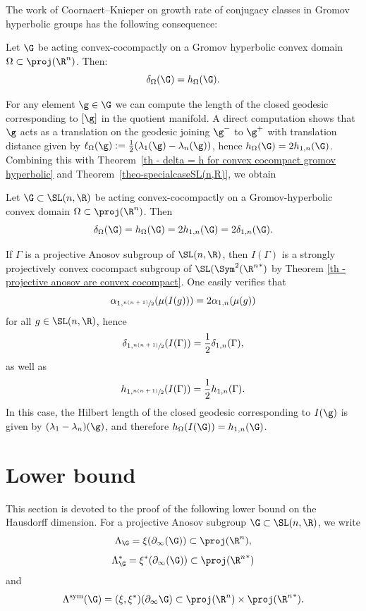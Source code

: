 The work of Coornaert--Knieper on growth rate of conjugacy classes in Gromov hyperbolic groups has the following consequence:
\begin{theorem}\label{th - delta = h for convex cocompact gromov hyperbolic}
Let $\G$ be acting convex-cocompactly on a Gromov hyperbolic convex domain $\Omega\subset \proj(\R^n)$. Then:
\[\delta_\Omega(\G)=h_\Omega(\G).\]
\end{theorem}

For any element $\g\in \G$ we can compute the length of the closed geodesic corresponding to $[\g]$ in the quotient manifold. A direct computation shows that $\g$ acts as a translation on the geodesic joining $\g^-$ to $\g^+$ with translation distance given by $\ell_{\Omega}(\g) := \frac{1}{2}(\lambda_1(\g)-\lambda_n(\g))$, hence $h_\Omega(\G)=2h_{1,n}(\G)$. Combining this with Theorem~\ref{th - delta = h for convex cocompact gromov hyperbolic} and Theorem~\ref{theo-specialcaseSL(n,R)}, we obtain
\begin{coro} \label{cor:deltaH=2delta1n}
Let $\G \subset \SL(n,\R)$ be acting convex-cocompactly on a Gromov-hyperbolic convex domain $\Omega\subset \proj(\R^n)$. Then
\[\delta_\Omega(\G)= h_\Omega(\G) = 2 h_{1,n}(\G) = 2 \delta_{1,n}(\G).\]
\end{coro}

\begin{rmk}
If $\Gamma$ is a projective Anosov subgroup of $\SL(n, \R)$, then $I(\Gamma)$ is a strongly projectively convex cocompact subgroup of $\SL(\Sym^2({\R^n}^*)$ by Theorem \ref{th - projective anosov are convex cocompact}. One easily verifies that
\[\alpha_{1, \sfrac{n(n+1)}{2}}(\mu(I(g))) = 2 \alpha_{1,n}(\mu(g))\]
for all $g\in \SL(n,\R)$, hence
\[\delta_{1, \sfrac{n(n+1)}{2}}(I(\Gamma)) = \frac{1}{2} \delta_{1,n}(\Gamma),\]
as well as
\[h_{1, \sfrac{n(n+1)}{2}}(I(\Gamma)) = \frac{1}{2} h_{1,n}(\Gamma).\]
In this case, the Hilbert length of the closed geodesic corresponding to $I(\g)$ is given by $(\lambda_1-\lambda_n)(\g)$, and therefore $h_\Omega(I(\G)) = h_{1,n}(\G)$.
\end{rmk}

\section{Lower bound} \label{sec - lower bound}
This section is devoted to the proof of the following lower bound on the Hausdorff dimension. For a projective Anosov subgroup $\G \subset \SL(n,\R)$, we write
\[\Lambda_\G = \xi(\partial_\infty(\G)) \subset \proj(\R^n),\]
\[\Lambda^*_\G = \xi^*(\partial_\infty(\G)) \subset \proj({\R^n}^*)\]
and
\[\Lambda^{\mathrm{sym}}(\G) = (\xi,\xi^*)(\partial_\infty \G) \subset \proj(\R^n)\times \proj({\R^n}^*).\]


